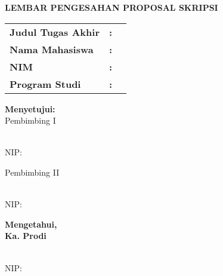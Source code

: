 \pagestyle{empty}
\begin{center}
\textbf{LEMBAR PENGESAHAN PROPOSAL SKRIPSI}

\vspace*{1cm}
\begin{tabular}{llp{10cm}}
\textbf{Judul Tugas Akhir}	& \textbf{:} & \textbf{\judulId} \\
\textbf{Nama Mahasiswa} 	& \textbf{:} & \textbf{\mahasiswa} \\
\textbf{NIM} 				& \textbf{:} & \textbf{\nim} \\
\textbf{Program Studi} 		& \textbf{:} & \textbf{\prodi} \\
\end{tabular}

\vspace*{1cm}
\textbf{Menyetujui:} \\
Pembimbing I

\vspace*{2cm}
\pembimbingUtama \\
NIP: \nipPembimbingUtama
	
\vspace*{1cm}
Pembimbing II

\vspace*{2cm}
\pembimbingPendamping \\
NIP: \nipPembimbingPendamping

\vfill
\textbf{Mengetahui,} \\
\textbf{Ka. Prodi \prodi}

\vspace*{2cm}
\kaprodi \\
NIP: \nipKaprodi
\end{center}
